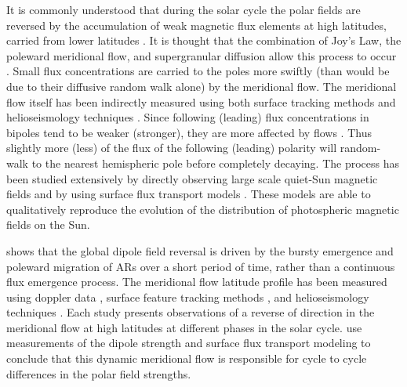 It is commonly understood that during the solar cycle the polar fields are reversed by the accumulation of weak magnetic flux elements at high latitudes, carried from lower latitudes \citep{Babcock:1961, Leighton:1964}. It is thought that the combination of Joy's Law, the poleward meridional flow, and supergranular diffusion allow this process to occur \citep{Mosher:1977}. Small flux concentrations are carried to the poles more swiftly (than would be due to their diffusive random walk alone) by the meridional flow. The meridional flow itself has been indirectly measured using both surface tracking methods and helioseismology techniques \citep{Hathaway:2010,Haber:2002,Zhao:2004}. Since following (leading) flux concentrations in bipoles tend to be weaker (stronger), they are more affected by flows \citep{Schrijver:1996}. Thus slightly more (less) of the flux of the following (leading) polarity will random-walk to the nearest hemispheric pole before completely decaying. The process has been studied extensively by directly observing large scale quiet-Sun magnetic fields \citep{Harvey:1992,Ulrich:2005,Schrijver:2008b} and by using surface flux transport models \citep{Leighton:1964,Wang:1989,Schrijver:2003}. These models are able to qualitatively reproduce the evolution of the distribution of photospheric magnetic fields on the Sun. 

\citet{Ulrich:2002} shows that the global dipole field reversal is driven by the bursty emergence and poleward migration of ARs over a short period of time, rather than a continuous flux emergence process. The meridional flow latitude profile has been measured using doppler data \citep{Ulrich:2005}, surface feature tracking methods \citep{Hathaway:2010}, and helioseismology techniques \citep{Haber:2002,Zhao:2004}. Each study presents observations of a reverse of direction in the meridional flow at high latitudes at different phases in the solar cycle. \citet{Schrijver:2008b} use measurements of the dipole strength and surface flux transport modeling to conclude that this dynamic meridional flow is responsible for cycle to cycle differences in the polar field strengths.

